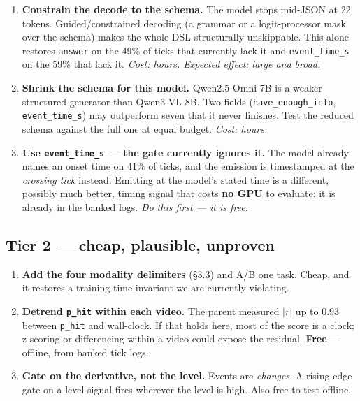 \documentclass[11pt,a4paper]{article}
\begin{document}
\begin{enumerate}
\item \textbf{Constrain the decode to the schema.} The model stops mid-JSON at 22 tokens.
Guided/constrained decoding (a grammar or a logit-processor mask over the schema) makes the
whole DSL structurally unskippable. This alone restores \texttt{answer} on the 49\% of ticks
that currently lack it and \texttt{event\_time\_s} on the 59\% that lack it.
\emph{Cost: hours. Expected effect: large and broad.}

\item \textbf{Shrink the schema for this model.} Qwen2.5-Omni-7B is a weaker structured
generator than Qwen3-VL-8B. Two fields (\texttt{have\_enough\_info},
\texttt{event\_time\_s}) may outperform seven that it never finishes. Test the reduced
schema against the full one at equal budget. \emph{Cost: hours.}

\item \textbf{Use \texttt{event\_time\_s} --- the gate currently ignores it.} The model
already names an onset time on 41\% of ticks, and the emission is timestamped at the
\emph{crossing tick} instead. Emitting at the model's stated time is a different, possibly
much better, timing signal that costs \textbf{no GPU} to evaluate: it is already in the
banked logs. \emph{Do this first --- it is free.}
\end{enumerate}

\subsection*{Tier 2 --- cheap, plausible, unproven}

\begin{enumerate}[resume]
\item \textbf{Add the four modality delimiters} (\S3.3) and A/B one task. Cheap, and it
restores a training-time invariant we are currently violating.

\item \textbf{Detrend \texttt{p\_hit} within each video.} The parent measured $|r|$ up to
0.93 between \texttt{p\_hit} and wall-clock. If that holds here, most of the score is a
clock; z-scoring or differencing within a video could expose the residual. \textbf{Free} ---
offline, from banked tick logs.

\item \textbf{Gate on the derivative, not the level.} Events are \emph{changes}. A
rising-edge gate on a level signal fires wherever the level is high. Also free to test
offline.
\end{enumerate}
\end{document}
